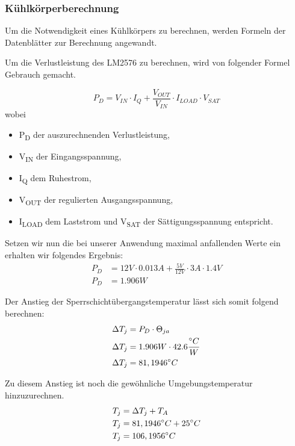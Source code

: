 \subsubsection{Kühlkörperberechnung}

Um die Notwendigkeit eines Kühlkörpers zu berechnen, werden Formeln der Datenblätter zur Berechnung angewandt.

Um die Verlustleistung des LM2576 zu berechnen, wird von folgender Formel Gebrauch gemacht.

\begin{equation}
    P_D = V_{IN} \cdot I_Q + \frac{V_{OUT}}{V_{IN}} \cdot I_{LOAD} \cdot V_{SAT}
\end{equation}
wobei
\begin{itemize}
\item P\textsubscript{D} der auszurechnenden Verlustleistung,
\item V\textsubscript{IN} der Eingangsspannung,
\item I\textsubscript{Q} dem Ruhestrom,
\item V\textsubscript{OUT} der regulierten Ausgangsspannung,
\item I\textsubscript{LOAD} dem Laststrom und V\textsubscript{SAT} der Sättigungsspannung entspricht.
\end{itemize}

Setzen wir nun die bei unserer Anwendung maximal anfallenden Werte ein erhalten wir folgendes Ergebnis:
\begin{align*}
P_D &= 12V \cdot 0.013A + \frac{5V}{12V} \cdot 3A \cdot 1.4V \\
P_D &= 1.906W
\end{align*}

Der Anstieg der Sperrschichtübergangstemperatur lässt sich somit folgend berechnen:
\begin{align}
\Delta T_j &= P_D \cdot \Theta_{ja} \\
\Delta T_j &= 1.906W \cdot 42.6\frac{{}^{\circ}C}{W} \notag \\
\Delta T_j &= 81,1946^{\circ}C \notag
\end{align}

Zu diesem Anstieg ist noch die gewöhnliche Umgebungstemperatur hinzuzurechnen.
\begin{align}
T_j &= \Delta  T_j + T_A \\
T_j &= 81,1946^{\circ}C + 25^{\circ}C \notag \\
T_j &= 106,1956^{\circ}C \notag
\end{align}

